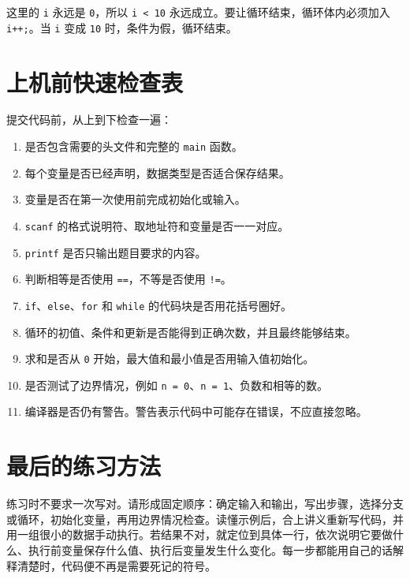 \documentclass[UTF8,zihao=-4,fontset=windows]{ctexart}
\begin{document}
这里的 \verb|i| 永远是 \verb|0|，所以 \verb|i < 10| 永远成立。要让循环结束，循环体内必须加入 \verb|i++;|。当 \verb|i| 变成 \verb|10| 时，条件为假，循环结束。

\section{上机前快速检查表}

提交代码前，从上到下检查一遍：
\begin{enumerate}
  \item 是否包含需要的头文件和完整的 \verb|main| 函数。
  \item 每个变量是否已经声明，数据类型是否适合保存结果。
  \item 变量是否在第一次使用前完成初始化或输入。
  \item \verb|scanf| 的格式说明符、取地址符和变量是否一一对应。
  \item \verb|printf| 是否只输出题目要求的内容。
  \item 判断相等是否使用 \verb|==|，不等是否使用 \verb|!=|。
  \item \verb|if|、\verb|else|、\verb|for| 和 \verb|while| 的代码块是否用花括号圈好。
  \item 循环的初值、条件和更新是否能得到正确次数，并且最终能够结束。
  \item 求和是否从 \verb|0| 开始，最大值和最小值是否用输入值初始化。
  \item 是否测试了边界情况，例如 \verb|n = 0|、\verb|n = 1|、负数和相等的数。
  \item 编译器是否仍有警告。警告表示代码中可能存在错误，不应直接忽略。
\end{enumerate}

\section*{最后的练习方法}

练习时不要求一次写对。请形成固定顺序：确定输入和输出，写出步骤，选择分支或循环，初始化变量，再用边界情况检查。读懂示例后，合上讲义重新写代码，并用一组很小的数据手动执行。若结果不对，就定位到具体一行，依次说明它要做什么、执行前变量保存什么值、执行后变量发生什么变化。每一步都能用自己的话解释清楚时，代码便不再是需要死记的符号。
\end{document}
